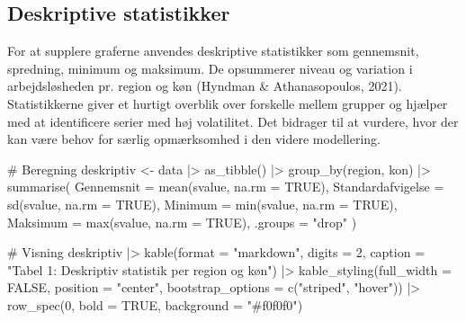 \documentclass[
]{article}
\newenvironment{Shaded}{\begin{snugshade}}{\end{snugshade}}
\newcommand{\AttributeTok}[1]{\textcolor[rgb]{0.40,0.45,0.13}{#1}}
\newcommand{\CommentTok}[1]{\textcolor[rgb]{0.37,0.37,0.37}{#1}}
\newcommand{\ConstantTok}[1]{\textcolor[rgb]{0.56,0.35,0.01}{#1}}
\newcommand{\DecValTok}[1]{\textcolor[rgb]{0.68,0.00,0.00}{#1}}
\newcommand{\FunctionTok}[1]{\textcolor[rgb]{0.28,0.35,0.67}{#1}}
\newcommand{\NormalTok}[1]{\textcolor[rgb]{0.00,0.23,0.31}{#1}}
\newcommand{\OtherTok}[1]{\textcolor[rgb]{0.00,0.23,0.31}{#1}}
\newcommand{\SpecialCharTok}[1]{\textcolor[rgb]{0.37,0.37,0.37}{#1}}
\newcommand{\StringTok}[1]{\textcolor[rgb]{0.13,0.47,0.30}{#1}}
\begin{document}
\subsection{Deskriptive statistikker}\label{deskriptive-statistikker}

For at supplere graferne anvendes deskriptive statistikker som
gennemsnit, spredning, minimum og maksimum. De opsummerer niveau og
variation i arbejdsløsheden pr. region og køn (Hyndman \&
Athanasopoulos, 2021). Statistikkerne giver et hurtigt overblik over
forskelle mellem grupper og hjælper med at identificere serier med høj
volatilitet. Det bidrager til at vurdere, hvor der kan være behov for
særlig opmærksomhed i den videre modellering.

\begin{Shaded}
\begin{Highlighting}[]
\CommentTok{\# Beregning}
\NormalTok{deskriptiv }\OtherTok{\textless{}{-}}\NormalTok{ data }\SpecialCharTok{|\textgreater{}} 
  \FunctionTok{as\_tibble}\NormalTok{() }\SpecialCharTok{|\textgreater{}}
  \FunctionTok{group\_by}\NormalTok{(region, kon) }\SpecialCharTok{|\textgreater{}} 
  \FunctionTok{summarise}\NormalTok{(}
    \AttributeTok{Gennemsnit =} \FunctionTok{mean}\NormalTok{(svalue, }\AttributeTok{na.rm =} \ConstantTok{TRUE}\NormalTok{),}
    \StringTok{\textasciigrave{}}\AttributeTok{Standardafvigelse}\StringTok{\textasciigrave{}} \OtherTok{=} \FunctionTok{sd}\NormalTok{(svalue, }\AttributeTok{na.rm =} \ConstantTok{TRUE}\NormalTok{),}
    \AttributeTok{Minimum =} \FunctionTok{min}\NormalTok{(svalue, }\AttributeTok{na.rm =} \ConstantTok{TRUE}\NormalTok{),}
    \AttributeTok{Maksimum =} \FunctionTok{max}\NormalTok{(svalue, }\AttributeTok{na.rm =} \ConstantTok{TRUE}\NormalTok{),}
    \AttributeTok{.groups =} \StringTok{"drop"}
\NormalTok{  )}

\CommentTok{\# Visning}
\NormalTok{deskriptiv }\SpecialCharTok{|\textgreater{}} 
  \FunctionTok{kable}\NormalTok{(}\AttributeTok{format =} \StringTok{"markdown"}\NormalTok{, }\AttributeTok{digits =} \DecValTok{2}\NormalTok{, }\AttributeTok{caption =} \StringTok{"Tabel 1: Deskriptiv statistik per region og køn"}\NormalTok{) }\SpecialCharTok{|\textgreater{}} 
  \FunctionTok{kable\_styling}\NormalTok{(}\AttributeTok{full\_width =} \ConstantTok{FALSE}\NormalTok{, }\AttributeTok{position =} \StringTok{"center"}\NormalTok{, }\AttributeTok{bootstrap\_options =} \FunctionTok{c}\NormalTok{(}\StringTok{"striped"}\NormalTok{, }\StringTok{"hover"}\NormalTok{)) }\SpecialCharTok{|\textgreater{}} 
  \FunctionTok{row\_spec}\NormalTok{(}\DecValTok{0}\NormalTok{, }\AttributeTok{bold =} \ConstantTok{TRUE}\NormalTok{, }\AttributeTok{background =} \StringTok{"\#f0f0f0"}\NormalTok{)}
\end{Highlighting}
\end{Shaded}
\end{document}
